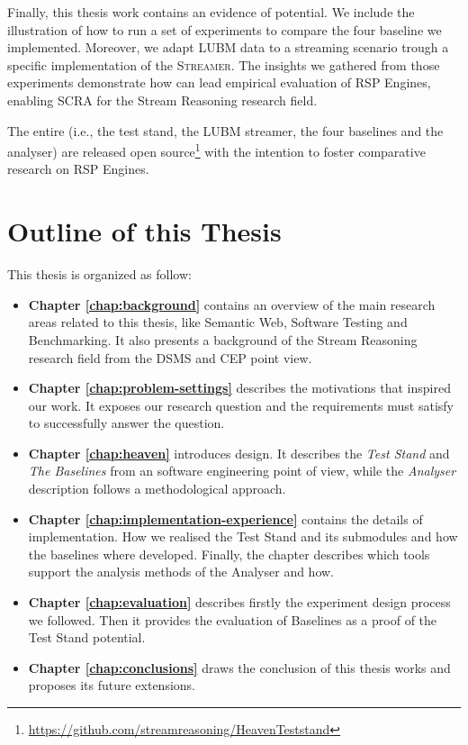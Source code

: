 Finally, this thesis work contains an evidence of \name potential. We include the illustration of how to run a set of experiments to compare the four baseline we implemented. Moreover, we adapt LUBM data to a streaming scenario trough a specific implementation of the \textsc{Streamer}. The insights we gathered from those experiments demonstrate how \name can lead empirical evaluation of RSP Engines, enabling SCRA for the Stream Reasoning research field.

The entire \name (i.e., the test stand, the LUBM streamer, the four baselines and the analyser) are released open source\footnote{\url{https://github.com/streamreasoning/HeavenTeststand}} with the intention to foster comparative research on RSP Engines.

\section{Outline of this Thesis}\label{sec:thesis-structure-intro}

This thesis is organized as follow:

\begin{itemize}

\item \textbf{Chapter \ref{chap:background}} contains an overview of the main research areas related to this thesis, like Semantic Web, Software Testing and Benchmarking. It also presents a background of the Stream Reasoning research field from the DSMS and CEP point view.
\item \textbf{Chapter \ref{chap:problem-settings}} describes the motivations that inspired our work. It exposes our research question and the requirements \name must satisfy to successfully answer the question.
\item \textbf{Chapter \ref{chap:heaven}} introduces \name design. It describes the \textit{Test Stand} and \textit{The Baselines} from an software engineering point of view, while the \textit{Analyser} description follows a methodological approach.
\item \textbf{Chapter \ref{chap:implementation-experience}} contains the details of \name implementation. How we realised the Test Stand and its submodules and how the baselines where developed. Finally, the chapter describes which tools support the analysis methods of the Analyser and how.
\item \textbf{Chapter \ref{chap:evaluation}} describes firstly the experiment design process we followed. Then it provides the evaluation of \name Baselines as a proof of the Test Stand potential.
\item \textbf{Chapter \ref{chap:conclusions}} draws the conclusion of this thesis works and proposes its future extensions.
\end{itemize}